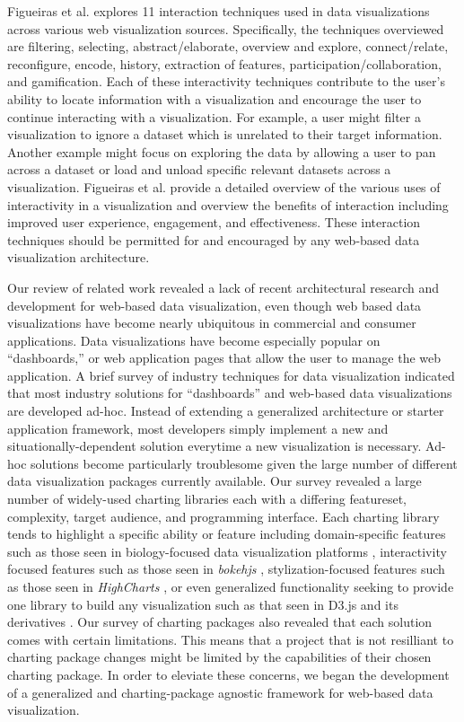 Figueiras et al. \cite{interaction} explores 11 interaction techniques used in data visualizations across various web visualization sources.  Specifically, the techniques overviewed are filtering, selecting, abstract/elaborate, overview and explore, connect/relate, reconfigure, encode, history, extraction of features, participation/collaboration, and gamification. Each of these interactivity techniques contribute to the user’s ability to locate information with a visualization and encourage the user to continue interacting with a visualization.  For example, a user might filter a visualization to ignore a dataset which is unrelated to their target information.  Another example might focus on exploring the data by allowing a user to pan across a dataset or load and unload specific relevant datasets across a visualization.  Figueiras et al. provide a detailed overview of the various uses of interactivity in a visualization and overview the benefits of interaction including improved user experience, engagement, and effectiveness.  These interaction techniques should be permitted for and encouraged by any web-based data visualization architecture. \par
Our review of related work revealed a lack of recent architectural research and development for web-based data visualization, even though web based data visualizations have become nearly ubiquitous in commercial and consumer applications.  Data visualizations have become especially popular on ``dashboards,'' or web application pages that allow the user to manage the web application.  A brief survey of industry techniques for data visualization indicated that most industry solutions for ``dashboards'' and web-based data visualizations are developed ad-hoc.  Instead of extending a generalized architecture or starter application framework, most developers simply implement a new and situationally-dependent solution everytime a new visualization is necessary.  Ad-hoc solutions become particularly troublesome given the large number of different data visualization packages currently available.  Our survey revealed a large number of widely-used charting libraries each with a differing featureset, complexity, target audience, and programming interface.  Each charting library tends to highlight a specific ability or feature including domain-specific features such as those seen in biology-focused data visualization platforms \cite{biojs}, interactivity focused features such as those seen in \textit{bokehjs}
\cite{bokehjs}, stylization-focused features such as those seen in \textit{HighCharts} \cite{highcharts}, or even generalized functionality seeking to provide one library to build any visualization such as that seen in D3.js and its derivatives \cite{d3homepage}.  Our survey of charting packages also revealed that each solution comes with certain limitations.  This means that a project that is not resilliant to charting package changes might be limited by the capabilities of their chosen charting package.  In order to eleviate these concerns, we began the development of a generalized and charting-package agnostic framework for web-based data visualization.
